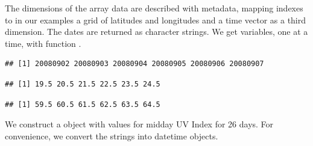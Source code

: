 \documentclass[krantz2]{krantz}\usepackage{knitr}%
\begin{document}
The dimensions of the array data are described with metadata, mapping indexes to in our examples a grid of latitudes and longitudes and a time vector as a third dimension. The dates are returned as character strings. We get variables, one at a time, with function .

\begin{knitrout}\footnotesize
{}\color{fgcolor}\begin{kframe}
\begin{alltt}
 \hlkwb{<-}  \hlstd{)}
\end{alltt}
\begin{verbatim}
## [1] 20080902 20080903 20080904 20080905 20080906 20080907
\end{verbatim}
\begin{alltt}
 \hlkwb{<-}   \hlstd{)}
\end{alltt}
\begin{verbatim}
## [1] 19.5 20.5 21.5 22.5 23.5 24.5
\end{verbatim}
\begin{alltt}
 \hlkwb{<-}   \hlstd{)}
\end{alltt}
\begin{verbatim}
## [1] 59.5 60.5 61.5 62.5 63.5 64.5
\end{verbatim}
\end{kframe}
\end{knitrout}

We construct a  object with values for midday UV Index for 26 days. For convenience, we convert the strings into \Rlang datetime objects.
\end{document}
